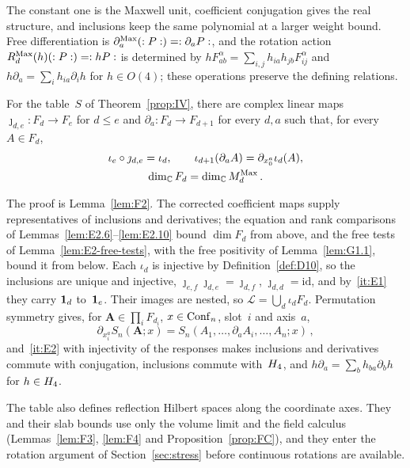 The constant one is the Maxwell unit, coefficient conjugation gives the real structure, and inclusions keep the same polynomial at a larger weight bound. Free differentiation is $\partial_a^{\rm Max}(:P:)=:\partial_aP:$, and the rotation action $R_d^{\rm Max}(h)(:P:)=:hP:$ is determined by $hF_{ab}^\alpha=\sum_{i,j}h_{ia}h_{jb}F_{ij}^\alpha$ and $h\partial_a=\sum_ih_{ia}\partial_ih$ for $h\in O(4)$; these operations preserve the defining relations.

\begin{proposition}\label{prop:FC}
For the table~$S$ of Theorem~\ref{prop:IV}, there are complex linear maps $\jmath_{d,e}:F_d\to F_e$ for $d\le e$ and $\partial_a:F_d\to F_{d+1}$ for every $d,a$ such that, for every $A\in F_d$,
\begin{gather*}
\iota_e\circ\jmath_{d,e}=\iota_d,\qquad
\iota_{d+1}(\partial_aA)=\partial_{x_0^a}\iota_d(A),\\
\dim_{\mathbb{C}} F_d=\dim_{\mathbb{C}}M_{d}^{\mathrm{Max}}\,.
\end{gather*}
\end{proposition}

The proof is Lemma~\ref{lem:F2}. The corrected coefficient maps supply representatives of inclusions and derivatives; the equation and rank comparisons of Lemmas~\ref{lem:E2.6}--\ref{lem:E2.10} bound $\dim F_d$ from above, and the free tests of Lemma~\ref{lem:E2-free-tests}, with the free positivity of Lemma~\ref{lem:G1.1}, bound it from below. Each $\iota_d$ is injective by Definition~\ref{def:D10}, so the inclusions are unique and injective, $\jmath_{e,f}\jmath_{d,e}=\jmath_{d,f}$, $\jmath_{d,d}=\mathrm{id}$, and by~\ref{it:E1} they carry $\mathbf{1}_{d}$ to~$\mathbf{1}_{e}$. Their images are nested, so $\mathcal L=\bigcup_d\iota_dF_d$. Permutation symmetry gives, for $\boldsymbol A\in\prod_iF_{d_i}$, $x\in\mathrm{Conf}_{n}$, slot~$i$ and axis~$a$,
\begin{equation*}
\partial_{x_i^a}S_n(\boldsymbol A;x)=S_n(A_1,\ldots,\partial_aA_i,\ldots,A_n;x)\,,
\end{equation*}
and~\ref{it:E2} with injectivity of the responses makes inclusions and derivatives commute with conjugation, inclusions commute with~$H_4$, and $h\partial_a=\sum_bh_{ba}\partial_bh$ for $h\in H_4$.

The table also defines reflection Hilbert spaces along the coordinate axes. They and their slab bounds use only the volume limit and the field calculus (Lemmas~\ref{lem:F3}, \ref{lem:F4} and Proposition~\ref{prop:FC}), and they enter the rotation argument of Section~\ref{sec:stress} before continuous rotations are available.

